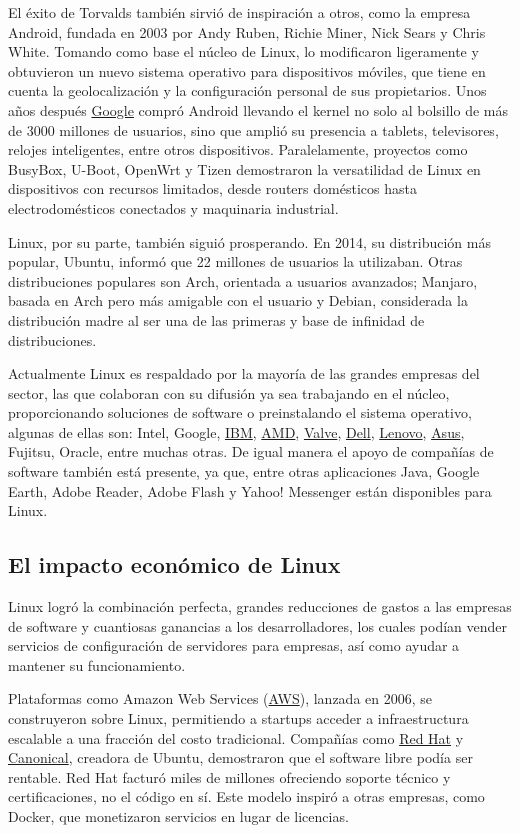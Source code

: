 \documentclass[a4paper,12pt]{article}
\begin{document}
El éxito de Torvalds también sirvió de inspiración a otros, como la empresa
Android, fundada en 2003 por Andy Ruben, Richie Miner, Nick Sears y Chris White.
Tomando como base el núcleo de Linux, lo modificaron ligeramente y obtuvieron un
nuevo sistema operativo para dispositivos móviles, que tiene en cuenta la
geolocalización y la configuración personal de sus propietarios. Unos años 
después \hyperlink{google}{Google} compró Android llevando el kernel no solo al bolsillo de más de
3000 millones de usuarios, sino que amplió su presencia a tablets, televisores,
relojes inteligentes, entre otros dispositivos. Paralelamente, proyectos como
BusyBox, U-Boot, OpenWrt y Tizen demostraron la versatilidad de Linux en
dispositivos con recursos limitados, desde routers domésticos hasta 
electrodomésticos conectados y maquinaria industrial.

Linux, por su parte, también siguió prosperando. En 2014, su distribución más
popular, Ubuntu, informó que 22 millones de usuarios la utilizaban. Otras
distribuciones populares son Arch, orientada a usuarios avanzados; Manjaro,
basada en Arch pero más amigable con el usuario y Debian, considerada la 
distribución madre al ser una de las primeras y base de infinidad de
distribuciones. 

Actualmente Linux es respaldado por la mayoría de las grandes empresas del
sector, las que colaboran con su difusión ya sea trabajando en el núcleo,
proporcionando soluciones de software o preinstalando el sistema operativo,
algunas de ellas son: Intel, Google, \hyperlink{ibm}{IBM}, \hyperlink{amd}{AMD},
\hyperlink{valve}{Valve}, \hyperlink{dell}{Dell}, \hyperlink{lenovo}{Lenovo},
\hyperlink{asus}{Asus}, Fujitsu, Oracle, entre muchas otras. De igual manera el
apoyo de compañías de software también está presente, ya que, entre otras
aplicaciones Java, Google Earth, Adobe Reader, Adobe Flash y Yahoo! Messenger
están disponibles para Linux.  

\subsection{El impacto económico de Linux}

Linux logró la combinación perfecta, grandes reducciones de gastos a las
empresas de software y cuantiosas ganancias a los desarrolladores, los cuales
podían vender servicios de configuración de servidores para empresas, así como
ayudar a mantener su funcionamiento. 

Plataformas como Amazon Web Services (\hyperlink{aws}{AWS}), lanzada en 2006, se
construyeron sobre Linux, permitiendo a startups acceder a infraestructura
escalable a una fracción del costo tradicional. Compañías como
\hyperlink{redhat}{Red Hat} y \hyperlink{canonical}{Canonical}, creadora de
Ubuntu, demostraron que el software libre podía ser rentable. Red Hat facturó
miles de millones ofreciendo soporte técnico y certificaciones, no el código en
sí. Este modelo inspiró a otras empresas, como Docker, que monetizaron servicios
en lugar de licencias.
\end{document}
